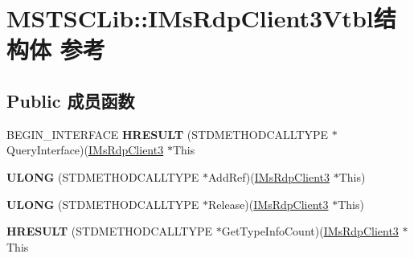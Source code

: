 \hypertarget{struct_m_s_t_s_c_lib_1_1_i_ms_rdp_client3_vtbl}{}\section{M\+S\+T\+S\+C\+Lib\+:\+:I\+Ms\+Rdp\+Client3\+Vtbl结构体 参考}
\label{struct_m_s_t_s_c_lib_1_1_i_ms_rdp_client3_vtbl}
\subsection*{Public 成员函数}
\begin{DoxyCompactItemize}
\item 
\mbox{\label{struct_m_s_t_s_c_lib_1_1_i_ms_rdp_client3_vtbl_ab6084284999ea5b27037aee853bca992}} 
B\+E\+G\+I\+N\+\_\+\+I\+N\+T\+E\+R\+F\+A\+CE {\bfseries H\+R\+E\+S\+U\+LT} (S\+T\+D\+M\+E\+T\+H\+O\+D\+C\+A\+L\+L\+T\+Y\+PE $\ast$Query\+Interface)(\hyperlink{interface_m_s_t_s_c_lib_1_1_i_ms_rdp_client3}{I\+Ms\+Rdp\+Client3} $\ast$This
\item 
\mbox{\label{struct_m_s_t_s_c_lib_1_1_i_ms_rdp_client3_vtbl_ab29c15ca12fa817b240e01a803f14cf2}} 
{\bfseries U\+L\+O\+NG} (S\+T\+D\+M\+E\+T\+H\+O\+D\+C\+A\+L\+L\+T\+Y\+PE $\ast$Add\+Ref)(\hyperlink{interface_m_s_t_s_c_lib_1_1_i_ms_rdp_client3}{I\+Ms\+Rdp\+Client3} $\ast$This)
\item 
\mbox{\label{struct_m_s_t_s_c_lib_1_1_i_ms_rdp_client3_vtbl_a82b06326e769dd0b0b20d3409b2c5395}} 
{\bfseries U\+L\+O\+NG} (S\+T\+D\+M\+E\+T\+H\+O\+D\+C\+A\+L\+L\+T\+Y\+PE $\ast$Release)(\hyperlink{interface_m_s_t_s_c_lib_1_1_i_ms_rdp_client3}{I\+Ms\+Rdp\+Client3} $\ast$This)
\item 
\mbox{\label{struct_m_s_t_s_c_lib_1_1_i_ms_rdp_client3_vtbl_a0ed7688c43af2988dad45039b7989d6a}} 
{\bfseries H\+R\+E\+S\+U\+LT} (S\+T\+D\+M\+E\+T\+H\+O\+D\+C\+A\+L\+L\+T\+Y\+PE $\ast$Get\+Type\+Info\+Count)(\hyperlink{interface_m_s_t_s_c_lib_1_1_i_ms_rdp_client3}{I\+Ms\+Rdp\+Client3} $\ast$This
\item 
\mbox{\label{struct_m_s_t_s_c_lib_1_1_i_ms_rdp_client3_vtbl_a7d61f94caa74538f9ba44394aee8b14e}} 

\end{DoxyCompactItemize}
